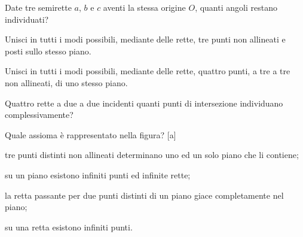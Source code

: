 \begin{esercizio}
\label{ese:1.37}
Date tre semirette \(a\), \(b\) e \(c\) aventi la stessa origine \(O\), 
quanti angoli restano individuati?
\end{esercizio}

\begin{esercizio}
\label{ese:1.38}
Unisci in tutti i modi possibili, mediante delle rette, tre punti non 
allineati e posti sullo stesso piano.
\end{esercizio}

\begin{esercizio}
\label{ese:1.39}
Unisci in tutti i modi possibili, mediante delle rette, quattro 
punti, a tre a tre non allineati, di uno stesso piano.
\end{esercizio}

\begin{esercizio}
\label{ese:1.40}
Quattro rette a due a due incidenti quanti punti di intersezione 
individuano complessivamente?
\end{esercizio}

\begin{esercizio}
\label{ese:1.41}
Quale assioma è rappresentato nella figura?
\hfill[a]

\begin{minipage}{.59 \textwidth}
\begin{enumeratea}
\item tre punti distinti non allineati determinano uno ed un solo 
piano che li contiene;
\item su un piano esistono infiniti punti ed infinite rette;
\item la retta passante per due punti distinti di un piano giace 
completamente nel piano;
\item su una retta esistono infiniti punti.
\end{enumeratea}
\end{minipage}
\hfil
\begin{minipage}{.39 \textwidth}
\begin{inaccessibleblock}
\centering
\end{inaccessibleblock}
\end{minipage}
\end{esercizio}



